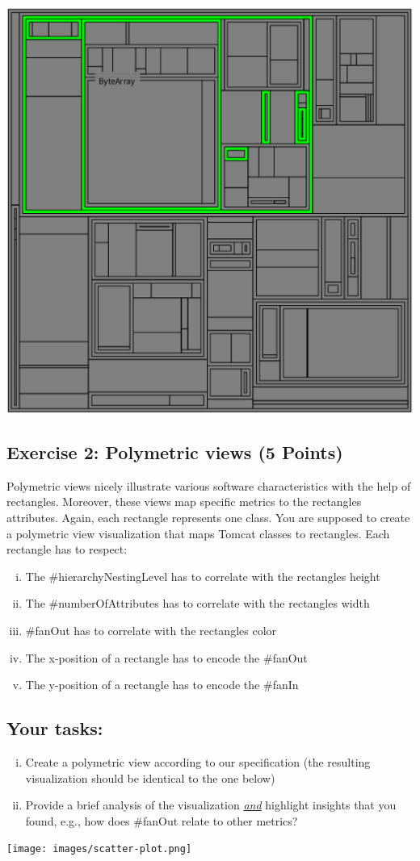 \documentclass [11pt, a4wide, twoside]{article}
\begin{document}
\includegraphics[scale=0.34]{images/treemap.png}
\subsection*{Exercise 2: Polymetric views (5 Points)}
Polymetric views nicely illustrate various software characteristics with the help of rectangles. Moreover, these views map specific metrics to the rectangles attributes. Again, each rectangle represents one class. You are supposed to create a polymetric view visualization that maps Tomcat classes to rectangles.
Each rectangle has to respect:
\begin{enumerate}[i)]
\item The \#hierarchyNestingLevel has to correlate with the rectangles height
\item The \#numberOfAttributes has to correlate with the rectangles width
\item \#fanOut has to correlate with the rectangles color
\item The x-position of a rectangle has to encode the \#fanOut
\item The y-position of a rectangle has to encode the \#fanIn
\end{enumerate}

\subsection*{Your tasks:}
\begin{enumerate}[i)]
\item Create a polymetric view according to our specification (the resulting visualization should be identical to the one below)
\item Provide a brief analysis of the visualization \textit{\underline{and}} highlight insights that you found, e.g., how does \#fanOut relate to other metrics?
\end{enumerate}

\vspace{1cm}

\texttt{[image: images/scatter-plot.png]}
\end{document}
